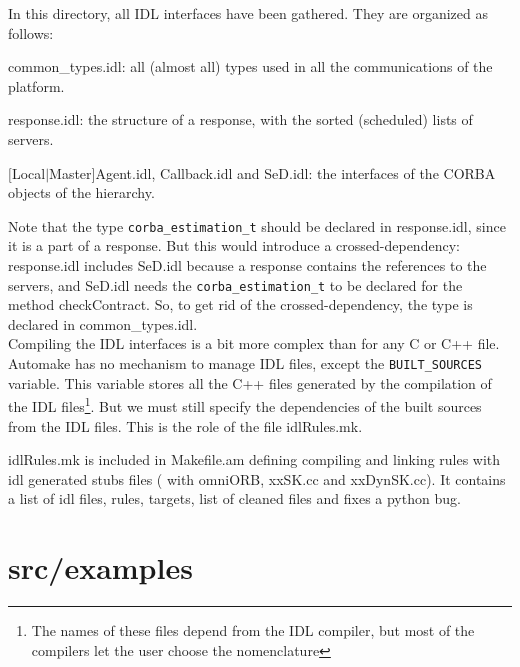   In this directory, all IDL interfaces have been gathered. They are organized as
  follows:
  \begin{description}
  \item {\sf common\_types.idl}: all (almost all) types used in all the
  communications of the platform.
  \item {\sf response.idl}: the structure of a response, with the sorted
  (scheduled) lists of servers.
  \item {$[$\textsf{Local$|$Master}$]$\textsf{Agent.idl}, \textsf{Callback.idl} and \textsf{SeD.idl}}: the interfaces of the CORBA objects of the hierarchy.
  \end{description}
  Note that the type \texttt{corba\_estimation\_t} should be declared in
  \textsf{response.idl}, since it is a part of a response. But this would
  introduce a crossed-dependency: \textsf{response.idl} includes \textsf{SeD.idl}
  because a response contains the references to the servers, and \textsf{SeD.idl}
  needs the \texttt{corba\_estimation\_t} to be declared for the method
  \textsf{checkContract}. So, to get rid of the crossed-dependency, the type is
  declared in \textsf{common\_types.idl}.
  \\

  Compiling the IDL interfaces is a bit more complex than for any C or C++ file.
  Automake has no mechanism to manage IDL files, except the
  \texttt{BUILT\_SOURCES} variable. This variable stores all the C++ files
  generated by the compilation of the IDL files\footnote{The names of these files
    depend from the IDL compiler, but most of the compilers let the user choose
      the nomenclature}. But we must still specify the dependencies of the built
      sources from the IDL files. This is the role of the file \textsf{idlRules.mk}.

      \textsf{idlRules.mk} is included in Makefile.am defining compiling and linking rules
      with idl generated stubs files ( with omniORB, xxSK.cc and xxDynSK.cc). It contains
      a list of idl files, rules, targets, list of cleaned files and fixes a python
      bug.



        \section{\textsf{src/examples}}
        \label{s:examples}

